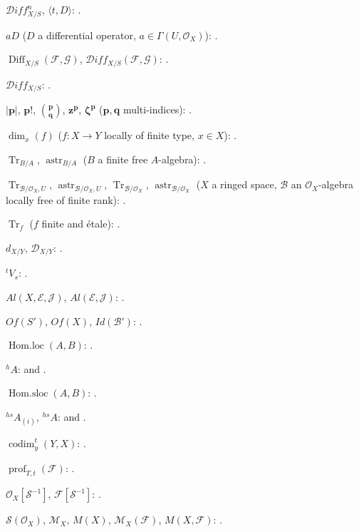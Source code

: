 $\mathcal{D}iff^{n}_{X/S}$, $\langle t,D\rangle$:
.

$aD$ ($D$ a differential operator, $a\in\Gamma(U,\mathcal{O}_X)$):
.

$\operatorname{Diff}_{X/S}(\mathcal{F},\mathcal{G})$,
$\mathcal{D}iff_{X/S}(\mathcal{F},\mathcal{G})$:
.

$\mathcal{D}iff_{X/S}$: .

$|\mathbf p|$, $\mathbf p!$, $\binom{\mathbf p}{\mathbf q}$,
$\mathbf z^{\mathbf p}$, $\boldsymbol\zeta^{\mathbf p}$
($\mathbf p,\mathbf q$ multi-indices): .

$\dim_x(f)$ ($f:X\to Y$ locally of finite type, $x\in X$):
.

$\operatorname{Tr}_{B/A}$, $\operatorname{astr}_{B/A}$
($B$ a finite free $A$-algebra): .

$\operatorname{Tr}_{\mathcal B/\mathcal O_X,U}$,
$\operatorname{astr}_{\mathcal B/\mathcal O_X,U}$,
$\operatorname{Tr}_{\mathcal B/\mathcal O_X}$,
$\operatorname{astr}_{\mathcal B/\mathcal O_X}$
($X$ a ringed space, $\mathcal B$ an $\mathcal O_X$-algebra locally free
of finite rank): .

$\operatorname{Tr}_f$ ($f$ finite and \'etale): .

$d_{X/Y}$, $\mathcal D_{X/Y}$: .

${}^{t}V_s$: .

$Al(X,\mathcal E,\mathcal J)$, $Al(\mathcal E,\mathcal J)$:
.

$Of(S')$, $Of(X)$, $Id(\mathcal B')$: .

$\operatorname{Hom.loc}(A,B)$: .

${}^{h}A$:  and .

$\operatorname{Hom.sloc}(A,B)$: .

${}^{hs}A_{(i)}$, ${}^{hs}A$:  and
.

$\operatorname{codim}^{t}_{y}(Y,X)$: .

$\operatorname{prof}_{T,t}(\mathcal F)$: .

$\mathcal O_X[\mathcal S^{-1}]$, $\mathcal F[\mathcal S^{-1}]$:
.

$\mathcal S(\mathcal O_X)$, $\mathcal M_X$, $M(X)$,
$\mathcal M_X(\mathcal F)$, $M(X,\mathcal F)$:
.


